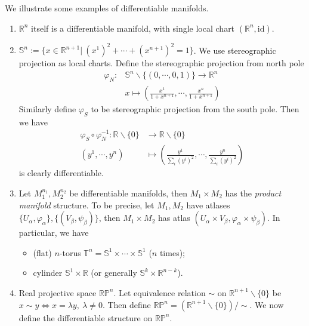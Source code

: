 \begin{eg}We illustrate some examples of differentiable manifolds.
    \begin{enumerate}[(1)]
        \item $\mathbb{R}^n$ itself is a differentiable manifold, with single local chart $(\mathbb{R}^n,\mathrm{id})$.
        \item $\mathbb{S}^n:=\{x\in\mathbb{R}^{n+1}|\ (x^1)^2+\cdots+(x^{n+1})^2=1\}$.
        We use stereographic projection as local charts.
        Define the stereographic projection from north pole
        \begin{align*}
            \varphi_N:&\mathbb{S}^n\backslash\{(0,\cdots,0,1)\}\to\mathbb{R}^n\\
            &x\mapsto\left(\frac{x^1}{1+x^{n+1}},\cdots,\frac{x^n}{1+x^{n+1}}\right)
        \end{align*}
        Similarly define $\varphi_S$ to be stereographic projection from the south pole.
        Then we have
        \begin{align*}
            \varphi_S\circ\varphi_N^{-1}:\mathbb{R}\backslash\{0\}&\to\mathbb{R}\backslash\{0\}\\
            (y^1,\cdots,y^n)&\mapsto\left(\frac{y^1}{\sum_i(y^i)^2},\cdots,\frac{y^n}{\sum_i(y^i)^2}\right)
        \end{align*}
        is clearly differentiable.
        \item Let $M_1^{n_1},M_2^{n_2}$ be differentiable manifolds, then $M_1\times M_2$ has the \emph{product manifold} structure.
        To be precise, let $M_1,M_2$ have atlases $\{U_\alpha,\varphi_\alpha\},\{(V_\beta,\psi_\beta)\}$, then $M_1\times M_2$ has atlas $(U_\alpha\times V_\beta,\varphi_\alpha\times\psi_\beta)$.
        In particular, we have
        \begin{itemize}
            \item (flat) $n$-torus $\mathbb{T}^n=\mathbb{S}^1\times\cdots\times\mathbb{S}^1$ ($n$ times);
            \item cylinder $\mathbb{S}^1\times\mathbb{R}$ (or generally $\mathbb{S}^k\times\mathbb{R}^{n-k}$).
        \end{itemize}
        \item Real projective space $\mathbb{RP}^n$.
        Let equivalence relation $\sim$ on $\mathbb{R}^{n+1}\backslash\{0\}$ be $x\sim y\iff x=\lambda y,\ \lambda\neq 0$.
        Then define $\mathbb{RP}^n=(\mathbb{R}^{n+1}\backslash\{0\})/\sim$.
        We now define the differentiable structure on $\mathbb{RP}^n$.

\end{enumerate}
\end{eg}
